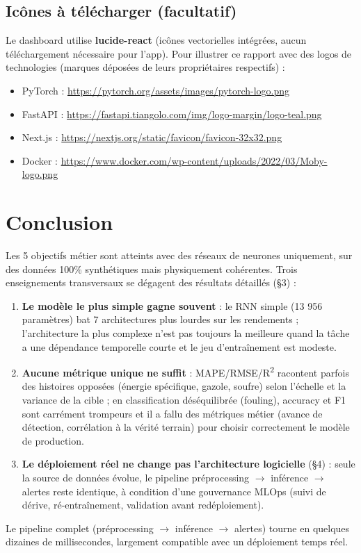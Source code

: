 \documentclass[11pt]{article}
\begin{document}
\subsection*{Icônes à télécharger (facultatif)}

Le dashboard utilise \textbf{lucide-react} (icônes vectorielles intégrées, aucun téléchargement
nécessaire pour l'app). Pour illustrer ce rapport avec des logos de technologies (marques
déposées de leurs propriétaires respectifs) :
\begin{itemize}
  \item PyTorch : \url{https://pytorch.org/assets/images/pytorch-logo.png}
  \item FastAPI : \url{https://fastapi.tiangolo.com/img/logo-margin/logo-teal.png}
  \item Next.js : \url{https://nextjs.org/static/favicon/favicon-32x32.png}
  \item Docker : \url{https://www.docker.com/wp-content/uploads/2022/03/Moby-logo.png}
\end{itemize}

\section{Conclusion}

Les 5 objectifs métier sont atteints avec des réseaux de neurones uniquement, sur des données
100\% synthétiques mais physiquement cohérentes. Trois enseignements transversaux se dégagent
des résultats détaillés (§3) :

\begin{enumerate}
  \item \textbf{Le modèle le plus simple gagne souvent} : le RNN simple (13 956 paramètres) bat
  7 architectures plus lourdes sur les rendements ; l'architecture la plus complexe n'est pas
  toujours la meilleure quand la tâche a une dépendance temporelle courte et le jeu
  d'entraînement est modeste.
  \item \textbf{Aucune métrique unique ne suffit} : MAPE/RMSE/R\textsuperscript{2} racontent
  parfois des histoires opposées (énergie spécifique, gazole, soufre) selon l'échelle et la
  variance de la cible ; en classification déséquilibrée (fouling), accuracy et F1 sont
  carrément trompeurs et il a fallu des métriques métier (avance de détection, corrélation à la
  vérité terrain) pour choisir correctement le modèle de production.
  \item \textbf{Le déploiement réel ne change pas l'architecture logicielle} (§4) : seule la
  source de données évolue, le pipeline préprocessing $\to$ inférence $\to$ alertes reste
  identique, à condition d'une gouvernance MLOps (suivi de dérive, ré-entraînement, validation
  avant redéploiement).
\end{enumerate}

Le pipeline complet (préprocessing $\to$ inférence $\to$ alertes) tourne en quelques dizaines de
millisecondes, largement compatible avec un déploiement temps réel.
\end{document}
